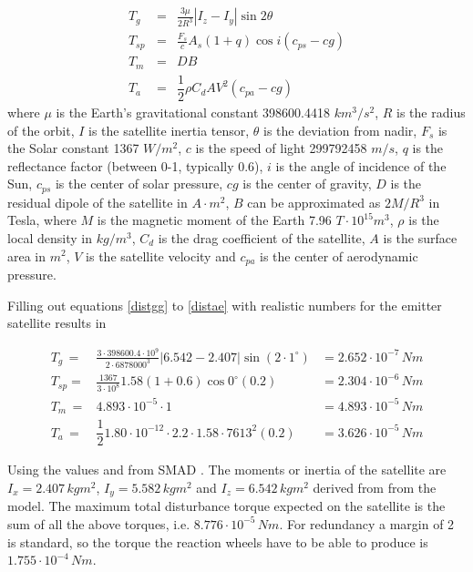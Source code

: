 \begin{eqnarray}
T_g \,&=& \frac{3\mu}{2R^3} \left|I_z - I_y \right| \sin{2\theta} \label{distgg} \\
T_{sp} &=& \frac{F_s}{c}A_s\left(1+q\right)\cos{i}\left(c_{ps}-cg\right) \label{distsr} \\
T_m \,&=& DB \label{distmf} \label{distmf} \\
T_a \,&=& \dfrac{1}{2}\rho C_dAV^2 \left(c_{pa} -cg\right) \label{distae}
\end{eqnarray}
where $\mu$ is the Earth's gravitational constant 398600.4418 $km^3/s^2$, $R$ is the radius of the orbit, $I$ is the satellite inertia tensor, $\theta$ is the deviation from nadir, $F_s$ is the Solar constant 1367 $W/m^2$, $c$ is the speed of light 299792458 $m/s$, $q$ is the reflectance factor (between 0-1, typically 0.6), $i$ is the angle of incidence of the Sun, $c_{ps}$ is the center of solar pressure, $cg$ is the center of gravity, $D$ is the residual dipole of the satellite in $A\cdot m^2$, $B$ can be approximated as $2M/R^3$ in Tesla, where $M$ is the magnetic moment of the Earth 7.96 $T\cdot 10^{15} m^3$, $\rho$ is the local density in $kg/m^3$, $C_d$ is the drag coefficient of the satellite, $A$ is the surface area in $m^2$, $V$ is the satellite velocity and $c_{pa}$ is the center of aerodynamic pressure.

Filling out equations \ref{distgg} to \ref{distae} with realistic numbers for the emitter satellite results in

\begin{eqnarray*}
T_g \,=& \frac{3\cdot 398600.4\cdot 10^9}{2\cdot 6878000^3} \left| 6.542 - 2.407 \right| \sin{\left(2\cdot 1^\circ \right)} &= 2.652\cdot 10^{-7}\,Nm\\
T_{sp} =& \frac{1367}{3\cdot 10^8}1.58\left(1+0.6\right)\cos{0^\circ}\left(0.2\right) &= 2.304 \cdot 10^{-6}\,Nm\\
T_m \,=& 4.893\cdot 10^{-5} \cdot 1  &= 4.893\cdot 10^{-5}\,Nm\\
T_a \,=& \dfrac{1}{2} 1.80 \cdot 10^{-12}\cdot 2.2\cdot 1.58 \cdot 7613^2 \left(0.2\right) &= 3.626 \cdot 10^{-5}\,Nm
\end{eqnarray*}

Using the values and from SMAD \cite{larson}. The moments or inertia of the satellite are $I_x = 2.407\,kgm^2$,  $I_y = 5.582\,kgm^2$ and $I_z = 6.542\,kgm^2$ derived from  from the model. The maximum total disturbance torque expected on the satellite is the sum of all the above torques, i.e. $8.776 \cdot 10^{-5}\,Nm$. For redundancy a margin of 2 is standard, so the torque the reaction wheels have to be able to produce is $1.755\cdot 10^{-4}\,Nm$.

